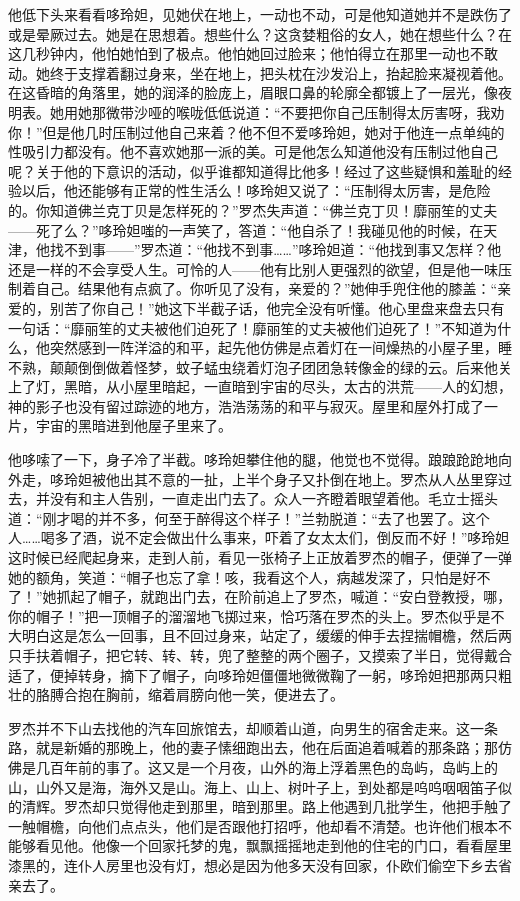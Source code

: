 \par 他低下头来看看哆玲妲，见她伏在地上，一动也不动，可是他知道她并不是跌伤了或是晕厥过去。她是在思想着。想些什么？这贪婪粗俗的女人，她在想些什么？在这几秒钟内，他怕她怕到了极点。他怕她回过脸来；他怕得立在那里一动也不敢动。她终于支撑着翻过身来，坐在地上，把头枕在沙发沿上，抬起脸来凝视着他。在这昏暗的角落里，她的润泽的脸庞上，眉眼口鼻的轮廓全都镀上了一层光，像夜明表。她用她那微带沙哑的喉咙低低说道：“不要把你自己压制得太厉害呀，我劝你！”但是他几时压制过他自己来着？他不但不爱哆玲妲，她对于他连一点单纯的性吸引力都没有。他不喜欢她那一派的美。可是他怎么知道他没有压制过他自己呢？关于他的下意识的活动，似乎谁都知道得比他多！经过了这些疑惧和羞耻的经验以后，他还能够有正常的性生活么！哆玲妲又说了：“压制得太厉害，是危险的。你知道佛兰克丁贝是怎样死的？”罗杰失声道：“佛兰克丁贝！靡丽笙的丈夫——死了么？”哆玲妲嗤的一声笑了，答道：“他自杀了！我碰见他的时候，在天津，他找不到事——”罗杰道：“他找不到事……”哆玲妲道：“他找到事又怎样？他还是一样的不会享受人生。可怜的人——他有比别人更强烈的欲望，但是他一味压制着自己。结果他有点疯了。你听见了没有，亲爱的？”她伸手兜住他的膝盖：“亲爱的，别苦了你自己！”她这下半截子话，他完全没有听懂。他心里盘来盘去只有一句话：“靡丽笙的丈夫被他们迫死了！靡丽笙的丈夫被他们迫死了！”不知道为什么，他突然感到一阵洋溢的和平，起先他仿佛是点着灯在一间燥热的小屋子里，睡不熟，颠颠倒倒做着怪梦，蚊子蜢虫绕着灯泡子团团急转像金的绿的云。后来他关上了灯，黑暗，从小屋里暗起，一直暗到宇宙的尽头，太古的洪荒——人的幻想，神的影子也没有留过踪迹的地方，浩浩荡荡的和平与寂灭。屋里和屋外打成了一片，宇宙的黑暗进到他屋子里来了。
\par 他哆嗦了一下，身子冷了半截。哆玲妲攀住他的腿，他觉也不觉得。踉踉跄跄地向外走，哆玲妲被他出其不意的一扯，上半个身子又扑倒在地上。罗杰从人丛里穿过去，并没有和主人告别，一直走出门去了。众人一齐瞪着眼望着他。毛立士摇头道：“刚才喝的并不多，何至于醉得这个样子！”兰勃脱道：“去了也罢了。这个人……喝多了酒，说不定会做出什么事来，吓着了女太太们，倒反而不好！”哆玲妲这时候已经爬起身来，走到人前，看见一张椅子上正放着罗杰的帽子，便弹了一弹她的额角，笑道：“帽子也忘了拿！咳，我看这个人，病越发深了，只怕是好不了！”她抓起了帽子，就跑出门去，在阶前追上了罗杰，喊道：“安白登教授，哪，你的帽子！”把一顶帽子的溜溜地飞掷过来，恰巧落在罗杰的头上。罗杰似乎是不大明白这是怎么一回事，且不回过身来，站定了，缓缓的伸手去捏揣帽檐，然后两只手扶着帽子，把它转、转、转，兜了整整的两个圈子，又摸索了半日，觉得戴合适了，便掉转身，摘下了帽子，向哆玲妲僵僵地微微鞠了一躬，哆玲妲把那两只粗壮的胳膊合抱在胸前，缩着肩膀向他一笑，便进去了。
\par 罗杰并不下山去找他的汽车回旅馆去，却顺着山道，向男生的宿舍走来。这一条路，就是新婚的那晚上，他的妻子愫细跑出去，他在后面追着喊着的那条路；那仿佛是几百年前的事了。这又是一个月夜，山外的海上浮着黑色的岛屿，岛屿上的山，山外又是海，海外又是山。海上、山上、树叶子上，到处都是呜呜咽咽笛子似的清辉。罗杰却只觉得他走到那里，暗到那里。路上他遇到几批学生，他把手触了一触帽檐，向他们点点头，他们是否跟他打招呼，他却看不清楚。也许他们根本不能够看见他。他像一个回家托梦的鬼，飘飘摇摇地走到他的住宅的门口，看看屋里漆黑的，连仆人房里也没有灯，想必是因为他多天没有回家，仆欧们偷空下乡去省亲去了。
